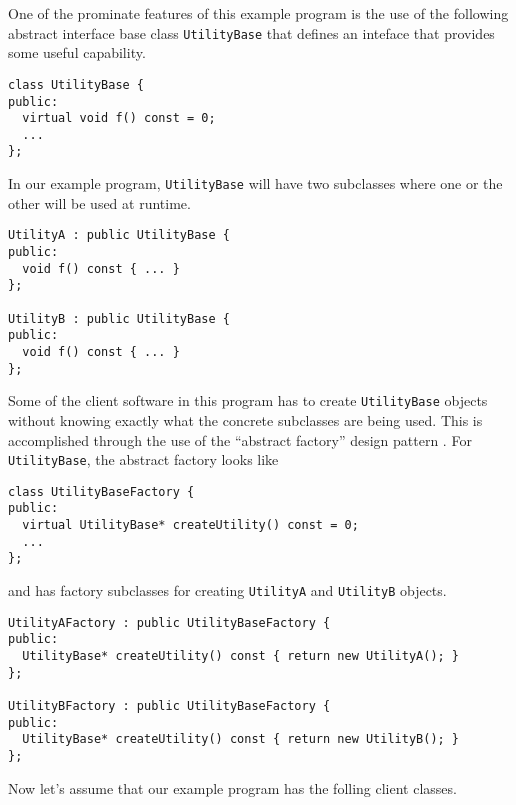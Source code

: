 \documentclass[pdf,ps2pdf,11pt]{SANDreport}
\begin{document}
One of the prominate features of this example program is the use of
the following abstract interface base class {}\texttt{Utility\-Base}
that defines an inteface that provides some useful capability.

{\small\begin{verbatim}
class UtilityBase {
public:
  virtual void f() const = 0;
  ...
};
\end{verbatim}}

In our example program, {}\texttt{Utility\-Base} will have two
subclasses where one or the other will be used at runtime.

{\small\begin{verbatim}
UtilityA : public UtilityBase {
public:
  void f() const { ... }
};

UtilityB : public UtilityBase {
public:
  void f() const { ... }
};
\end{verbatim}}

Some of the client software in this program has to create
{}\texttt{Utility\-Base} objects without knowing exactly what the
concrete subclasses are being used.  This is accomplished through the
use of the ``abstract factory'' design pattern
{}\cite{ref:gama_et_al_1995}.  For {}\texttt{Utility\-Base}, the
abstract factory looks like

{\small\begin{verbatim}
class UtilityBaseFactory {
public:
  virtual UtilityBase* createUtility() const = 0;
  ...
};
\end{verbatim}}

{}\noindent{}and has factory subclasses for creating
{}\texttt{Utility\-A} and {}\texttt{Utility\-B} objects.

{\small\begin{verbatim}
UtilityAFactory : public UtilityBaseFactory {
public:
  UtilityBase* createUtility() const { return new UtilityA(); }
};

UtilityBFactory : public UtilityBaseFactory {
public:
  UtilityBase* createUtility() const { return new UtilityB(); }
};
\end{verbatim}}

Now let's assume that our example program has the folling client
classes.
\end{document}
